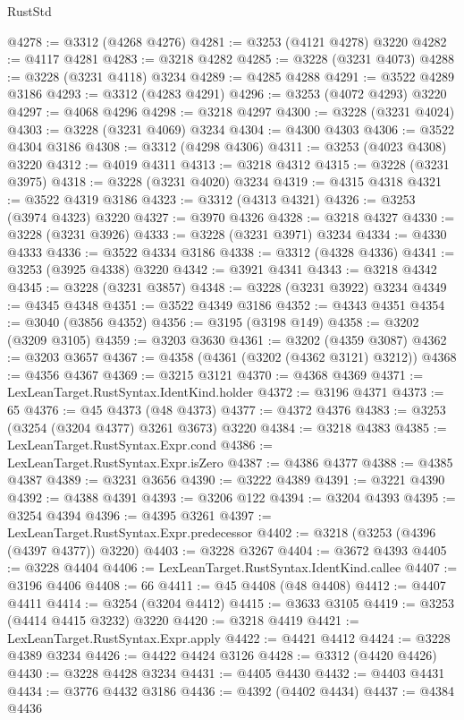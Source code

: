 \begin{lexlean}{RustStd}
\begin{coremodule}
@4278 := @3312 (@4268 @4276)
@4281 := @3253 (@4121 @4278) @3220
@4282 := @4117 @4281
@4283 := @3218 @4282
@4285 := @3228 (@3231 @4073)
@4288 := @3228 (@3231 @4118) @3234
@4289 := @4285 @4288
@4291 := @3522 @4289 @3186
@4293 := @3312 (@4283 @4291)
@4296 := @3253 (@4072 @4293) @3220
@4297 := @4068 @4296
@4298 := @3218 @4297
@4300 := @3228 (@3231 @4024)
@4303 := @3228 (@3231 @4069) @3234
@4304 := @4300 @4303
@4306 := @3522 @4304 @3186
@4308 := @3312 (@4298 @4306)
@4311 := @3253 (@4023 @4308) @3220
@4312 := @4019 @4311
@4313 := @3218 @4312
@4315 := @3228 (@3231 @3975)
@4318 := @3228 (@3231 @4020) @3234
@4319 := @4315 @4318
@4321 := @3522 @4319 @3186
@4323 := @3312 (@4313 @4321)
@4326 := @3253 (@3974 @4323) @3220
@4327 := @3970 @4326
@4328 := @3218 @4327
@4330 := @3228 (@3231 @3926)
@4333 := @3228 (@3231 @3971) @3234
@4334 := @4330 @4333
@4336 := @3522 @4334 @3186
@4338 := @3312 (@4328 @4336)
@4341 := @3253 (@3925 @4338) @3220
@4342 := @3921 @4341
@4343 := @3218 @4342
@4345 := @3228 (@3231 @3857)
@4348 := @3228 (@3231 @3922) @3234
@4349 := @4345 @4348
@4351 := @3522 @4349 @3186
@4352 := @4343 @4351
@4354 := @3040 (@3856 @4352)
@4356 := @3195 (@3198 @149)
@4358 := @3202 (@3209 @3105)
@4359 := @3203 @3630
@4361 := @3202 (@4359 @3087)
@4362 := @3203 @3657
@4367 := @4358 (@4361 (@3202 (@4362 @3121) @3212))
@4368 := @4356 @4367
@4369 := @3215 @3121
@4370 := @4368 @4369
@4371 := LexLeanTarget.RustSyntax.IdentKind.holder
@4372 := @3196 @4371
@4373 := 65
@4376 := @45 @4373 (@48 @4373)
@4377 := @4372 @4376
@4383 := @3253 (@3254 (@3204 @4377) @3261 @3673) @3220
@4384 := @3218 @4383
@4385 := LexLeanTarget.RustSyntax.Expr.cond
@4386 := LexLeanTarget.RustSyntax.Expr.isZero
@4387 := @4386 @4377
@4388 := @4385 @4387
@4389 := @3231 @3656
@4390 := @3222 @4389
@4391 := @3221 @4390
@4392 := @4388 @4391
@4393 := @3206 @122
@4394 := @3204 @4393
@4395 := @3254 @4394
@4396 := @4395 @3261
@4397 := LexLeanTarget.RustSyntax.Expr.predecessor
@4402 := @3218 (@3253 (@4396 (@4397 @4377)) @3220)
@4403 := @3228 @3267
@4404 := @3672 @4393
@4405 := @3228 @4404
@4406 := LexLeanTarget.RustSyntax.IdentKind.callee
@4407 := @3196 @4406
@4408 := 66
@4411 := @45 @4408 (@48 @4408)
@4412 := @4407 @4411
@4414 := @3254 (@3204 @4412)
@4415 := @3633 @3105
@4419 := @3253 (@4414 @4415 @3232) @3220
@4420 := @3218 @4419
@4421 := LexLeanTarget.RustSyntax.Expr.apply
@4422 := @4421 @4412
@4424 := @3228 @4389 @3234
@4426 := @4422 @4424 @3126
@4428 := @3312 (@4420 @4426)
@4430 := @3228 @4428 @3234
@4431 := @4405 @4430
@4432 := @4403 @4431
@4434 := @3776 @4432 @3186
@4436 := @4392 (@4402 @4434)
@4437 := @4384 @4436

\end{coremodule}
\end{lexlean}
